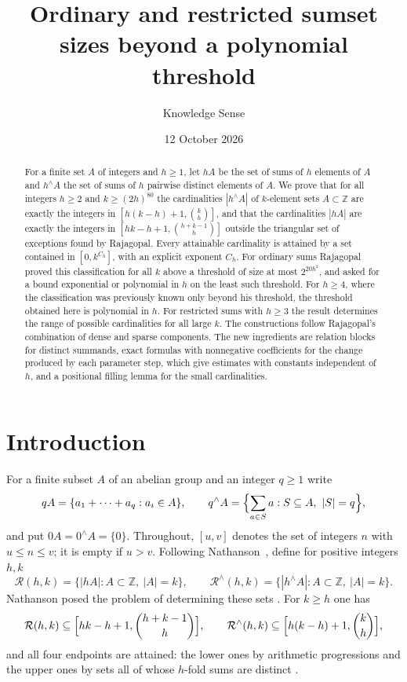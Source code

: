 \documentclass[11pt]{amsart}
\title[Ordinary and restricted sumset sizes]{Ordinary and restricted sumset sizes beyond a polynomial threshold}
\author{Knowledge Sense}
\date{12 October 2026}
\theoremstyle{definition}
\theoremstyle{remark}
\numberwithin{equation}{section}
\newcommand{\Z}{\mathbb{Z}}
\newcommand{\R}{\mathcal{R}}
\newcommand{\Rr}{\mathcal{R}^{\wedge}}
\newcommand{\res}[2]{#1^{\wedge}#2}
\begin{document}
\begin{abstract}
For a finite set $A$ of integers and $h\ge 1$, let $hA$ be the set of sums of $h$ elements of $A$ and $\res{h}{A}$ the set of sums of $h$ pairwise distinct elements of $A$. We prove that for all integers $h\ge 2$ and $k\ge (2h)^{80}$ the cardinalities $|\res hA|$ of $k$-element sets $A\subset\Z$ are exactly the integers in $[h(k-h)+1,\binom kh]$, and that the cardinalities $|hA|$ are exactly the integers in $[hk-h+1,\binom{h+k-1}{h}]$ outside the triangular set of exceptions found by Rajagopal. Every attainable cardinality is attained by a set contained in $[0,k^{C_h}]$, with an explicit exponent $C_h$. For ordinary sums Rajagopal proved this classification for all $k$ above a threshold of size at most $2^{20h^2}$, and asked for a bound exponential or polynomial in $h$ on the least such threshold. For $h\ge 4$, where the classification was previously known only beyond his threshold, the threshold obtained here is polynomial in $h$. For restricted sums with $h\ge 3$ the result determines the range of possible cardinalities for all large $k$. The constructions follow Rajagopal's combination of dense and sparse components. The new ingredients are relation blocks for distinct summands, exact formulas with nonnegative coefficients for the change produced by each parameter step, which give estimates with constants independent of $h$, and a positional filling lemma for the small cardinalities.
\end{abstract}

\maketitle

\section{Introduction}

For a finite subset $A$ of an abelian group and an integer $q\ge 1$ write
\[
qA=\{a_1+\dots+a_q: a_i\in A\},\qquad \res qA=\Bigl\{\sum_{a\in S}a: S\subseteq A,\ |S|=q\Bigr\},
\]
and put $0A=\res 0A=\{0\}$. Throughout, $[u,v]$ denotes the set of integers $n$ with $u\le n\le v$; it is empty if $u>v$. Following Nathanson~\cite{Nat25}, define for positive integers $h,k$
\[
\R(h,k)=\{|hA|: A\subset\Z,\ |A|=k\},\qquad \Rr(h,k)=\{|\res hA|: A\subset\Z,\ |A|=k\}.
\]
Nathanson posed the problem of determining these sets \cite[Problem~1]{Nat25}. For $k\ge h$ one has
\begin{equation}\label{eq:trivial}
\R(h,k)\subseteq\Bigl[hk-h+1,\binom{h+k-1}{h}\Bigr],\qquad \Rr(h,k)\subseteq\Bigl[h(k-h)+1,\binom kh\Bigr],
\end{equation}
and all four endpoints are attained: the lower ones by arithmetic progressions and the upper ones by sets all of whose $h$-fold sums are distinct \cite[Theorem~2]{Nat25}.
\end{document}
